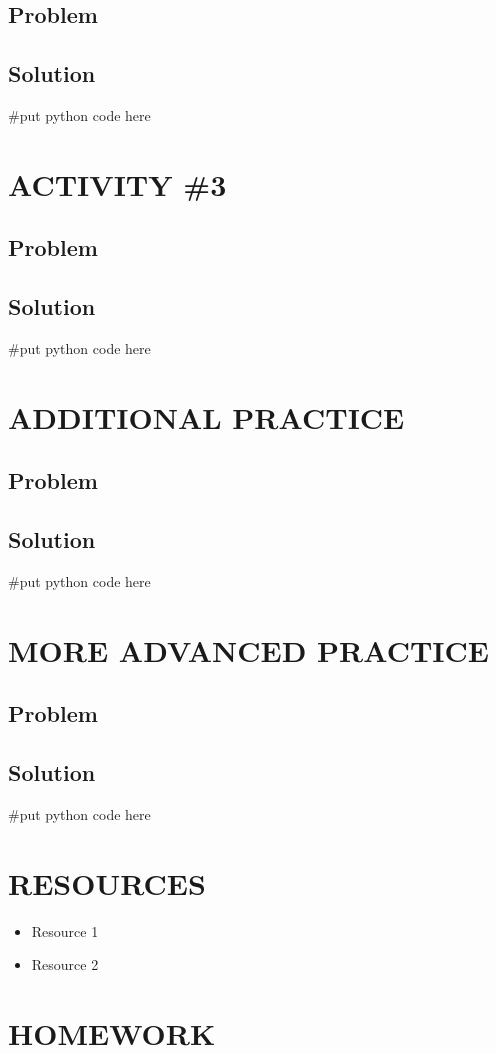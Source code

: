 \documentclass[14pt]{extreport}%
\begin{document}
\subsection*{Problem}
\subsection*{Solution}
\begin{python}
#put python code here
\end{python}

\section*{ACTIVITY \#3} 
\subsection*{Problem}
\subsection*{Solution}
\begin{python}
#put python code here
\end{python}

\section*{ADDITIONAL PRACTICE} 
\subsection*{Problem}
\subsection*{Solution}
\begin{python}
#put python code here
\end{python}

\section*{MORE ADVANCED PRACTICE} 
\subsection*{Problem}
\subsection*{Solution}
\begin{python}
#put python code here
\end{python}

\section*{RESOURCES}
\begin{itemize}
    \item Resource 1
    \item Resource 2
\end{itemize}

\section*{HOMEWORK}
\end{document}
